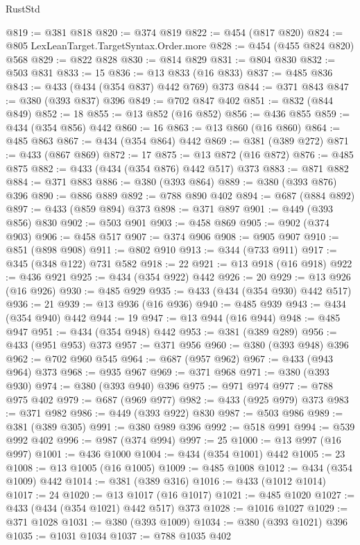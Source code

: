 \begin{lexlean}{RustStd}
\begin{coremodule}
@819 := @381 @818
@820 := @374 @819
@822 := @454 (@817 @820)
@824 := @805 LexLeanTarget.TargetSyntax.Order.more
@828 := @454 (@455 @824 @820) @568
@829 := @822 @828
@830 := @814 @829
@831 := @804 @830
@832 := @503 @831
@833 := 15
@836 := @13 @833 (@16 @833)
@837 := @485 @836
@843 := @433 (@434 (@354 @837) @442 @769) @373
@844 := @371 @843
@847 := @380 (@393 @837) @396
@849 := @702 @847 @402
@851 := @832 (@844 @849)
@852 := 18
@855 := @13 @852 (@16 @852)
@856 := @436 @855
@859 := @434 (@354 @856) @442
@860 := 16
@863 := @13 @860 (@16 @860)
@864 := @485 @863
@867 := @434 (@354 @864) @442
@869 := @381 (@389 @272)
@871 := @433 (@867 @869)
@872 := 17
@875 := @13 @872 (@16 @872)
@876 := @485 @875
@882 := @433 (@434 (@354 @876) @442 @517) @373
@883 := @871 @882
@884 := @371 @883
@886 := @380 (@393 @864)
@889 := @380 (@393 @876) @396
@890 := @886 @889
@892 := @788 @890 @402
@894 := @687 (@884 @892)
@897 := @433 (@859 @894) @373
@898 := @371 @897
@901 := @449 (@393 @856) @830
@902 := @503 @901
@903 := @458 @869
@905 := @902 (@374 @903)
@906 := @458 @517
@907 := @374 @906
@908 := @905 @907
@910 := @851 (@898 @908)
@911 := @802 @910
@913 := @344 (@733 @911)
@917 := @345 (@348 @122) @731 @582
@918 := 22
@921 := @13 @918 (@16 @918)
@922 := @436 @921
@925 := @434 (@354 @922) @442
@926 := 20
@929 := @13 @926 (@16 @926)
@930 := @485 @929
@935 := @433 (@434 (@354 @930) @442 @517)
@936 := 21
@939 := @13 @936 (@16 @936)
@940 := @485 @939
@943 := @434 (@354 @940) @442
@944 := 19
@947 := @13 @944 (@16 @944)
@948 := @485 @947
@951 := @434 (@354 @948) @442
@953 := @381 (@389 @289)
@956 := @433 (@951 @953) @373
@957 := @371 @956
@960 := @380 (@393 @948) @396
@962 := @702 @960 @545
@964 := @687 (@957 @962)
@967 := @433 (@943 @964) @373
@968 := @935 @967
@969 := @371 @968
@971 := @380 (@393 @930)
@974 := @380 (@393 @940) @396
@975 := @971 @974
@977 := @788 @975 @402
@979 := @687 (@969 @977)
@982 := @433 (@925 @979) @373
@983 := @371 @982
@986 := @449 (@393 @922) @830
@987 := @503 @986
@989 := @381 (@389 @305)
@991 := @380 @989 @396
@992 := @518 @991
@994 := @539 @992 @402
@996 := @987 (@374 @994)
@997 := 25
@1000 := @13 @997 (@16 @997)
@1001 := @436 @1000
@1004 := @434 (@354 @1001) @442
@1005 := 23
@1008 := @13 @1005 (@16 @1005)
@1009 := @485 @1008
@1012 := @434 (@354 @1009) @442
@1014 := @381 (@389 @316)
@1016 := @433 (@1012 @1014)
@1017 := 24
@1020 := @13 @1017 (@16 @1017)
@1021 := @485 @1020
@1027 := @433 (@434 (@354 @1021) @442 @517) @373
@1028 := @1016 @1027
@1029 := @371 @1028
@1031 := @380 (@393 @1009)
@1034 := @380 (@393 @1021) @396
@1035 := @1031 @1034
@1037 := @788 @1035 @402

\end{coremodule}
\end{lexlean}
